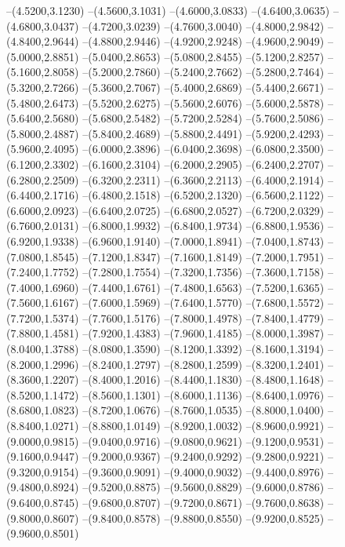 {	--(4.5200,3.1230)
	--(4.5600,3.1031)
	--(4.6000,3.0833)
	--(4.6400,3.0635)
	--(4.6800,3.0437)
	--(4.7200,3.0239)
	--(4.7600,3.0040)
	--(4.8000,2.9842)
	--(4.8400,2.9644)
	--(4.8800,2.9446)
	--(4.9200,2.9248)
	--(4.9600,2.9049)
	--(5.0000,2.8851)
	--(5.0400,2.8653)
	--(5.0800,2.8455)
	--(5.1200,2.8257)
	--(5.1600,2.8058)
	--(5.2000,2.7860)
	--(5.2400,2.7662)
	--(5.2800,2.7464)
	--(5.3200,2.7266)
	--(5.3600,2.7067)
	--(5.4000,2.6869)
	--(5.4400,2.6671)
	--(5.4800,2.6473)
	--(5.5200,2.6275)
	--(5.5600,2.6076)
	--(5.6000,2.5878)
	--(5.6400,2.5680)
	--(5.6800,2.5482)
	--(5.7200,2.5284)
	--(5.7600,2.5086)
	--(5.8000,2.4887)
	--(5.8400,2.4689)
	--(5.8800,2.4491)
	--(5.9200,2.4293)
	--(5.9600,2.4095)
	--(6.0000,2.3896)
	--(6.0400,2.3698)
	--(6.0800,2.3500)
	--(6.1200,2.3302)
	--(6.1600,2.3104)
	--(6.2000,2.2905)
	--(6.2400,2.2707)
	--(6.2800,2.2509)
	--(6.3200,2.2311)
	--(6.3600,2.2113)
	--(6.4000,2.1914)
	--(6.4400,2.1716)
	--(6.4800,2.1518)
	--(6.5200,2.1320)
	--(6.5600,2.1122)
	--(6.6000,2.0923)
	--(6.6400,2.0725)
	--(6.6800,2.0527)
	--(6.7200,2.0329)
	--(6.7600,2.0131)
	--(6.8000,1.9932)
	--(6.8400,1.9734)
	--(6.8800,1.9536)
	--(6.9200,1.9338)
	--(6.9600,1.9140)
	--(7.0000,1.8941)
	--(7.0400,1.8743)
	--(7.0800,1.8545)
	--(7.1200,1.8347)
	--(7.1600,1.8149)
	--(7.2000,1.7951)
	--(7.2400,1.7752)
	--(7.2800,1.7554)
	--(7.3200,1.7356)
	--(7.3600,1.7158)
	--(7.4000,1.6960)
	--(7.4400,1.6761)
	--(7.4800,1.6563)
	--(7.5200,1.6365)
	--(7.5600,1.6167)
	--(7.6000,1.5969)
	--(7.6400,1.5770)
	--(7.6800,1.5572)
	--(7.7200,1.5374)
	--(7.7600,1.5176)
	--(7.8000,1.4978)
	--(7.8400,1.4779)
	--(7.8800,1.4581)
	--(7.9200,1.4383)
	--(7.9600,1.4185)
	--(8.0000,1.3987)
	--(8.0400,1.3788)
	--(8.0800,1.3590)
	--(8.1200,1.3392)
	--(8.1600,1.3194)
	--(8.2000,1.2996)
	--(8.2400,1.2797)
	--(8.2800,1.2599)
	--(8.3200,1.2401)
	--(8.3600,1.2207)
	--(8.4000,1.2016)
	--(8.4400,1.1830)
	--(8.4800,1.1648)
	--(8.5200,1.1472)
	--(8.5600,1.1301)
	--(8.6000,1.1136)
	--(8.6400,1.0976)
	--(8.6800,1.0823)
	--(8.7200,1.0676)
	--(8.7600,1.0535)
	--(8.8000,1.0400)
	--(8.8400,1.0271)
	--(8.8800,1.0149)
	--(8.9200,1.0032)
	--(8.9600,0.9921)
	--(9.0000,0.9815)
	--(9.0400,0.9716)
	--(9.0800,0.9621)
	--(9.1200,0.9531)
	--(9.1600,0.9447)
	--(9.2000,0.9367)
	--(9.2400,0.9292)
	--(9.2800,0.9221)
	--(9.3200,0.9154)
	--(9.3600,0.9091)
	--(9.4000,0.9032)
	--(9.4400,0.8976)
	--(9.4800,0.8924)
	--(9.5200,0.8875)
	--(9.5600,0.8829)
	--(9.6000,0.8786)
	--(9.6400,0.8745)
	--(9.6800,0.8707)
	--(9.7200,0.8671)
	--(9.7600,0.8638)
	--(9.8000,0.8607)
	--(9.8400,0.8578)
	--(9.8800,0.8550)
	--(9.9200,0.8525)
	--(9.9600,0.8501)
}
